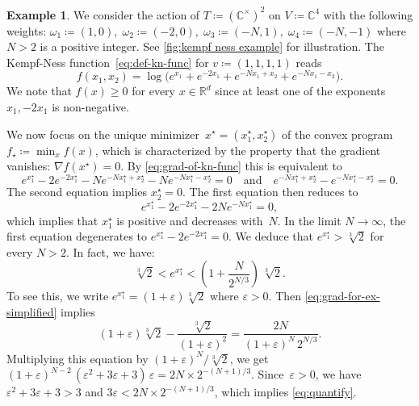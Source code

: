 \documentclass[10pt,a4paper]{article}
\theoremstyle{definition}
\newtheorem{example}[theorem]{Example}
\newcommand{\CC}{\mathbb{C}}
\newcommand{\RR}{\mathbb{R}}
\numberwithin{equation}{section}
\begin{document}
\begin{example}
\label{ex:small-hessian}
We consider the action of $T\coloneqq (\CC^\times)^2$ on $V\coloneqq\CC^4$ with the following weights: $\omega_1\coloneqq (1,0),\;\omega_2\coloneqq (-2,0),\; \omega_3\coloneqq(-N,1),\; \omega_4\coloneqq(-N,-1)$ where $N>2$ is a positive integer.
See \cref{fig:kempf ness example} for illustration.
The Kempf-Ness function~\eqref{eq:def-kn-func} for $v\coloneqq (1,1,1,1)$ reads
\[
f(x_1,x_2) = \log\Big( e^{x_1} + e^{-2x_1} + e^{-N x_1 + x_2} + e^{-N x_1 - x_2}\Big).
\]
We note that $f(x)\geq 0$ for every $x\in\RR^d$ since at least one of the exponents $x_1, -2x_1$ is non-negative.

We now focus on the unique minimizer~$x^\star=(x^\star_1,x^\star_2)$ of the convex program $f_\star\coloneqq\min_x f(x)$, which is characterized by the property that the gradient vanishes: $\nabla f(x^\star)=0$.
By \cref{eq:grad-of-kn-func} this is equivalent to
\begin{equation}\label{eq:grad-for-ex}
	e^{x^\star_1} - 2e^{-2x^\star_1} - N e^{-Nx^\star_1+x^\star_2}  - N e^{-Nx^\star_1-x^\star_2} = 0
\quad\text{and}\quad
  e^{-Nx^\star_1+x^\star_2} - e^{-Nx^\star_1-x^\star_2} = 0.
\end{equation}
The second equation implies $x^\star_2=0$.
The first equation then reduces to
\begin{equation}\label{eq:grad-for-ex-simplified}
  e^{x^\star_1} - 2e^{-2x^\star_1} - 2 N e^{-Nx^\star_1} = 0,
\end{equation}
which implies that $x^\star_1$ is positive and decreases with~$N$.
In the limit $N\rightarrow\infty$, the first equation degenerates to $e^{x^\star_1}-2 e^{-2x^\star_1}=0$.
We deduce that $e^{x^{\star}_1}>\sqrt[3]{2}$ for every $N>2$.
In fact, we have:
\begin{equation}\label{eq:quantify}
  \sqrt[3]{2} < e^{x^{\star}_1} < \left( 1+\frac N{2^{N/3}} \right)\, \sqrt[3]{2}.
\end{equation}
To see this, we write $e^{x^\star_1}=(1+\varepsilon)\sqrt[3]{2}$ where $\varepsilon>0$.
Then \cref{eq:grad-for-ex-simplified} implies
\[
  (1+\varepsilon) \sqrt[3]{2} - \frac{\sqrt[3]{2}}{(1+\varepsilon)^2} = \frac{2N}{(1+\varepsilon)^N\, 2^{N/3}}.
\]
Multiplying this equation by $(1+\varepsilon)^N / \sqrt[3]{2}$, we get $(1+\varepsilon)^{N-2}\,(\varepsilon^2 + 3\varepsilon+3)\, \varepsilon = 2N \times 2^{-(N+1)/3}$.
Since~$\varepsilon>0$, we have $\varepsilon^2+3\varepsilon+3>3$ and $3\varepsilon < 2N \times 2^{-(N+1)/3}$, which implies \cref{eq:quantify}.


\end{example}
\end{document}
